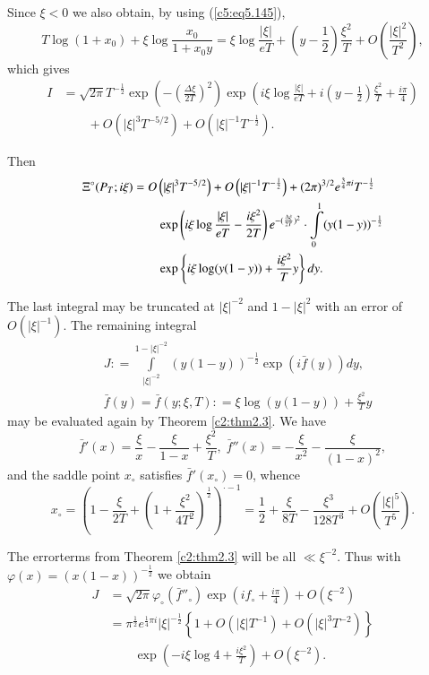 Since $\xi < 0$ we also obtain, by using (\ref{c5:eq5.145}),
$$
 T \log (1+ x_0) + \xi \log \frac{x_0}{1+x_0 y} = \xi \log
 \frac{|\xi|}{eT} + \left(y-\frac{1}{2} \right) \frac{\xi^2}{T} + O
 \left(\frac{|\xi|^2}{T^2} \right), 
$$
which gives
\begin{align*}
I & = \sqrt{2\pi} T^{-\frac{1}{2}} \exp \left(- \left(\frac{\Delta \xi}{2T} \right)^2 \right) \exp \left(i\xi \log \frac{|\xi|}{eT} + i \left(y-\frac{1}{2} \right) \frac{\xi^2}{T} + \frac{i\pi}{4} \right)\\
&\qquad +  O\left(|\xi|^3 T^{-5/2}\right) + O\left(|\xi|^{-1}
T^{-\frac{1}{2}}\right). 
\end{align*}

Then 
\begin{align}
\Xi^\circ (P_T ; i\xi) & = O \left(|\xi|^3 T^{-5/2}\right) +
O\left(|\xi|^{-1} T^{-\frac{1}{2}}\right) +  
(2\pi)^{3/2} e^{\frac{3}{4} \pi i}
T^{-\frac{1}{2}}\label{c5:eq5.146}\\ 
& \qquad \exp \left(i\xi \log \frac{|\xi|}{eT} - \frac{i\xi^2}{2T}
\right) e^{-(\frac{\Delta \xi}{2T})^2} \cdot \int\limits^1_0
(y(1-y))^{-\frac{1}{2}}\notag\\ 
& \qquad \exp \left\{ i \xi \log (y (1-y)) + \frac{i \xi^2}{T}
y\right\} dy.\notag 
\end{align}

The last integral may be truncated at $|\xi|^{-2}$ and $1-|\xi|^2$
with an error of $O(|\xi|^{-1})$. The remaining integral 
\begin{align*}
& J : = \int\limits^{1-|\xi|^{-2}}_{|\xi|^{-2}}
  (y(1-y))^{-\frac{1}{2}} \exp (i\bar{f}(y)) dy,\\ 
& \bar{f} (y) = \bar{f} (y; \xi, T): =  \xi \log (y (1-y)) +
  \frac{\xi^2}{T} y 
\end{align*}
may be evaluated again by Theorem \ref{c2:thm2.3}. We have 
$$ 
\bar{f}'(x) = \frac{\xi}{x} - \frac{\xi}{1-x} + \frac{\xi^2}{T},  \;
\bar{f}'' (x) = - \frac{\xi}{x^2} -\frac{\xi}{(1-x)^2}, 
$$
and the saddle point $x_\circ$ satisfies $\bar{f}'(x_\circ) = 0$,
whence 
$$ 
x_\circ = \left(1-\frac{\xi}{2T} + \left(1+ \frac{\xi^2}{4T^2}
\right)^{\frac{1}{2}} \right)^{\cdot -1} = \frac{1}{2} +
\frac{\xi}{8T} -\frac{\xi^3}{128 T^3} + O \left(\frac{|\xi|^5}{T^5}\right).  
$$

The error\pageoriginale terms from Theorem \ref{c2:thm2.3} will be all
$\ll \xi^{-2}$. Thus with $\varphi(x) = (x (1-x))^{-\frac{1}{2}}$ we
obtain 
\begin{align*}
J &= \sqrt{2\pi} \varphi_\circ (\bar{f}''_\circ) \exp \left(if_\circ +
\frac{i\pi}{4} \right) + O (\xi^{-2})\\ 
&= \pi^{\frac{1}{2}} e^{\frac{1}{4} \pi i} |\xi|^{-\frac{1}{2}}
\left\{1+O\left(|\xi| T^{-1}\right) + O \left(|\xi|^3
T^{-2}\right)\right\}\\ 
&\qquad\exp \left(-i\xi \log 4 +
\frac{i\xi^2}{T} \right) + O (\xi^{-2}). 
\end{align*}

